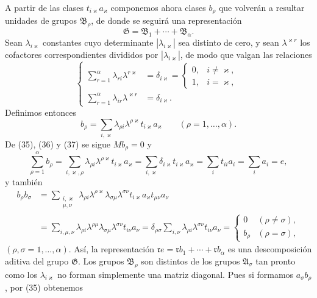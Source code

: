 \documentclass[11pt]{article}
\begin{document}
A partir de las clases $t_{i\varkappa}a_\varkappa$ componemos ahora clases $b_\rho$ que volverán a resultar unidades de grupos $\mathfrak B_\rho$, de donde se seguirá una representación
\[
 \mathfrak G=\mathfrak B_1+\cdots+\mathfrak B_\alpha.
\]
Sean $\lambda_{i\varkappa}$ constantes cuyo determinante $|\lambda_{i\varkappa}|$ sea distinto de cero, y sean $\lambda^{\varkappa r}$ los cofactores correspondientes divididos por $|\lambda_{i\varkappa}|$, de modo que valgan las relaciones
\begin{equation}
\left\{
\begin{aligned}
 \sum_{r=1}^{\alpha}\lambda_{ri}\lambda^{r\varkappa}&=\delta_{i\varkappa}=\begin{cases}0,&i\ne\varkappa,\\1,&i=\varkappa,
 \end{cases}\\
 \sum_{r=1}^{\alpha}\lambda_{ir}\lambda^{\varkappa r}&=\delta_{i\varkappa}.
\end{aligned}\right.
\tag{36}
\end{equation}
Definimos entonces
\begin{equation}
 b_\rho=\sum_{i,\varkappa}\lambda_{\rho i}\lambda^{\rho\varkappa}t_{i\varkappa}a_\varkappa
 \qquad(\rho=1,
\ldots,\alpha).
\tag{37}
\end{equation}
De (35), (36) y (37) se sigue $Mb_\rho=0$ y
\begin{equation}
 \sum_{\rho=1}^{\alpha}b_\rho
 =\sum_{i,\varkappa,\rho}\lambda_{\rho i}\lambda^{\rho\varkappa}t_{i\varkappa}a_\varkappa
 =\sum_{i,\varkappa}\delta_{i\varkappa}t_{i\varkappa}a_\varkappa
 =\sum_i t_{ii}a_i=\sum_i a_i=e,
\tag{38}
\end{equation}
y también
\[
\begin{aligned}
 b_\rho b_\sigma
 &=\sum_{\substack{i,\varkappa\\ \mu,\nu}}
  \lambda_{\rho i}\lambda^{\rho\varkappa}\lambda_{\sigma\mu}\lambda^{\sigma\nu}
  t_{i\varkappa}a_\varkappa t_{\mu\nu}a_\nu \\
 &=\sum_{i,\mu,\nu}\lambda_{\rho i}\lambda^{\rho\mu}\lambda_{\sigma\mu}\lambda^{\sigma\nu}t_{i\nu}a_\nu
 =\delta_{\rho\sigma}\sum_{i,\nu}\lambda_{\rho i}\lambda^{\sigma\nu}t_{i\nu}a_\nu
 =\begin{cases}0&(\rho\ne\sigma),\\ b_\rho&(\rho=\sigma),\end{cases}
\end{aligned}
\]
$(\rho,\sigma=1,\ldots,\alpha)$. Así, la representación $\mathfrak r e=\mathfrak r b_1+\cdots+\mathfrak r b_\alpha$ es una descomposición aditiva del grupo $\mathfrak G$. Los grupos $\mathfrak B_\rho$ son distintos de los grupos $\mathfrak A_\sigma$ tan pronto como los $\lambda_{i\varkappa}$ no forman simplemente una matriz diagonal. Pues si formamos $a_\sigma b_\rho$, por (35) obtenemos
\end{document}
